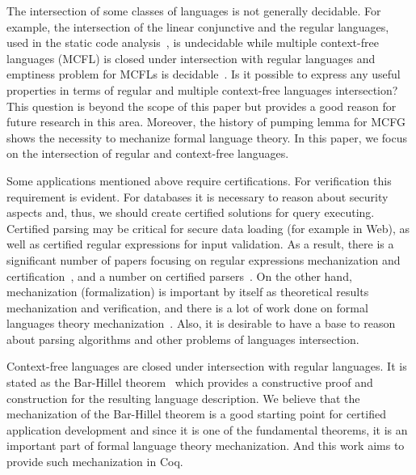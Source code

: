 The intersection of some classes of languages is not generally decidable.
For example, the intersection of the linear conjunctive and the regular languages, used in the static code analysis~\cite{zhang2017context}, is undecidable while multiple context-free languages (MCFL) is closed under intersection with regular languages and emptiness problem for MCFLs is decidable~\cite{SEKI1991191}.
Is it possible to express any useful properties in terms of regular and multiple context-free languages intersection?
This question is beyond the scope of this paper but provides a good reason for future research in this area.
Moreover, the history of pumping lemma for MCFG shows the necessity to mechanize formal language theory.
In this paper, we focus on the intersection of regular and context-free languages.

Some applications mentioned above require certifications.
For verification this requirement is evident.
For databases it is necessary to reason about security aspects and, thus, we should create certified solutions for query executing.
Certified parsing may be critical for secure data loading (for example in Web), as well as certified regular expressions for input validation.
As a result, there is a significant number of papers focusing on regular expressions mechanization and certification~\cite{10.1007/978-3-319-03545-1_7}, and a number on certified parsers~\cite{10.1007/978-3-642-00590-9_12,firsov2014certified,Gross2015ParsingPA}.
On the other hand, mechanization (formalization) is important by itself as theoretical results mechanization and verification, and there is a lot of work done on formal languages theory mechanization~\cite{firsov2015certified,ramos2016formalization,1885-16399}.
Also, it is desirable to have a base to reason about parsing algorithms and other problems of languages intersection.

Context-free languages are closed under intersection with regular languages.
It is stated as the Bar-Hillel theorem~\cite{bar1961formal} which provides a constructive proof and construction for the resulting language description.
We believe that the mechanization of the Bar-Hillel theorem is a good starting point for certified application development and since it is one of the fundamental theorems, it is an important part of formal language theory mechanization.
And this work aims to provide such mechanization in Coq.

